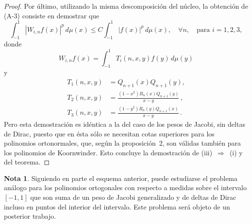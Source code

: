 \documentclass[a4paper,12pt]{article}
\theoremstyle{plain}
\theoremstyle{definition}
\newtheorem*{nota}{Nota}
\begin{document}
\begin{proof}
\fussy
Por \'ultimo, utilizando la misma descomposici\'on del n\'ucleo,
la obtenci\'on de (A-3) consiste en demostrar que
$$
\int_{-1}^1 |W_{i,n}f(x)|^{p}\,d\mu(x) \leq C
\int_{-1}^1 |f(x)|^{p}\,d\mu(x) , \quad\forall n,
\quad\text{para } i = 1,2,3,
$$
donde
$$
W_{i,n}f(x) = \int_{-1}^1 T_{i}(n,x,y)f(y)\,d\mu(y)
$$
y
\begin{align*}
T_{1}(n,x,y) &= Q_{n+1}(x)Q_{n+1}(y) , \\
T_{2}(n,x,y) &= \frac{(1-x^{2})R_{n}(x)Q_{n+1}(y)}{x-y}\,, \\
T_{3}(n,x,y) &= \frac{(1-y^{2})R_{n}(y)Q_{n+1}(x)}{x-y}\,.
\end{align*}
Pero esta demostraci\'on es id\'entica a la del caso de los pesos
de Jacobi, sin deltas de Dirac, puesto que en \'esta s\'olo se
necesitan cotas superiores para los polinomios ortonormales,
que, seg\'un la proposici\'on~2, son v\'alidas tambi\'en para
los polinomios de Koornwinder. Esto concluye la demostraci\'on
de (iii)~$\Rightarrow$~(i) y del teorema.
\end{proof}

\begin{nota}
Siguiendo en parte el esquema anterior, puede estudiarse
el problema an\'alogo para los polinomios ortogonales con respecto
a medidas sobre el intervalo $[-1,1]$ que son suma de un peso de
Jacobi generalizado y de deltas de Dirac incluso en puntos del
interior del intervalo. Este problema ser\'a objeto de un posterior
trabajo.
\end{nota}
\end{document}

